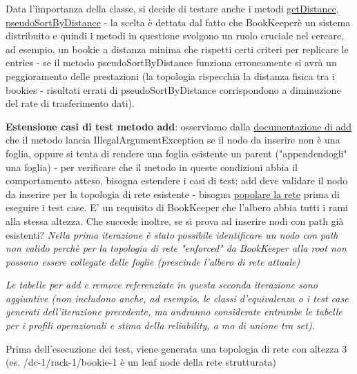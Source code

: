 \documentclass[10pt, a4paper]{article}
\def\bookkeeper{BookKeeper}
\begin{document}
	Data l'importanza della classe, si decide di testare anche i metodi 
	\href{https://bookkeeper.apache.org/docs/latest/api/javadoc/org/apache/bookkeeper/net/NetworkTopologyImpl.html#getDistance(org.apache.bookkeeper.net.Node,org.apache.bookkeeper.net.Node)}
	{getDistance},
	\href{https://bookkeeper.apache.org/docs/latest/api/javadoc/org/apache/bookkeeper/net/NetworkTopologyImpl.html#pseudoSortByDistance(org.apache.bookkeeper.net.Node,org.apache.bookkeeper.net.Node[])}
	{pseudoSortByDistance}
	- la scelta è dettata dal fatto che \bookkeeper\;è un sistema distribuito e quindi i metodi in questione svolgono un ruolo cruciale
	nel cercare, ad esempio, un bookie a distanza minima che rispetti certi criteri per replicare le entries - se il metodo pseudoSortByDistance
	funziona erroneamente si avrà un peggioramento delle prestazioni (la topologia rispecchia la distanza fisica tra i bookies - risultati errati di pseudoSortByDistance corrispondono a diminuzione del rate di trasferimento dati).
	
	\textbf{Estensione casi di test metodo add}: osserviamo dalla 
	\href{https://bookkeeper.apache.org/docs/latest/api/javadoc/org/apache/bookkeeper/net/NetworkTopologyImpl.html#add(org.apache.bookkeeper.net.Node)}
	{documentazione di add}
	che il metodo lancia IllegalArgumentException se il nodo da inserire non è una foglia, oppure si tenta
	di rendere una foglia esistente un parent ("appendendogli" una foglia) - per verificare che il metodo
	in queste condizioni abbia il comportamento atteso, bisogna estendere i casi di test: add deve validare il 
	nodo da inserire per la topologia di rete esistente - bisogna \underline{popolare la rete} prima di eseguire i test case. 
	E' un requisito di \bookkeeper\; che l'albero abbia tutti i rami alla stessa altezza.
	Che succede inoltre, se si prova ad inserire nodi con path già esistenti?
	\textit{Nella prima iterazione è stato possibile identificare un nodo con path non valido perchè per la topologia
	di rete "enforced" da \bookkeeper\; alla root non possono essere collegate delle foglie (prescinde l'albero
	di rete attuale)}
	
	\textit{Le tabelle per add e remove referenziate in questa seconda iterazione sono aggiuntive (non includono anche,
	ad esempio, le classi d'equivalenza o i test case generati dell'iterazione precedente, ma andranno considerate
	entrambe le tabelle per i profili operazionali e stima della reliability, a mo di unione tra set).}
	
	Prima dell'esecuzione dei test, viene generata una topologia di rete con altezza 3 (es. /dc-1/rack-1/bookie-1 
	è un leaf node della rete strutturata)
	
\end{document}

